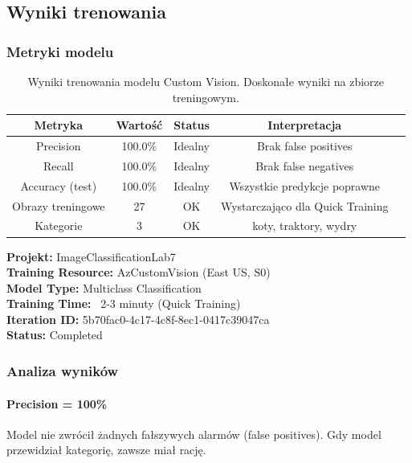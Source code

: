 \subsection{Wyniki trenowania}

\subsubsection{Metryki modelu}

\begin{table}[H]
	\centering
	\begin{tabular}{|c|c|c|c|c|}
		\hline
		\textbf{Metryka} & \textbf{Wartość} & \textbf{Status} & \textbf{Interpretacja} \\
		\hline
		Precision & 100.0\% & Idealny & Brak false positives \\
		\hline
		Recall & 100.0\% & Idealny & Brak false negatives \\
		\hline
		Accuracy (test) & 100.0\% & Idealny & Wszystkie predykcje poprawne \\
		\hline
		Obrazy treningowe & 27 & OK & Wystarczająco dla Quick Training \\
		\hline
		Kategorie & 3 & OK & koty, traktory, wydry \\
		\hline
	\end{tabular}
	\caption{Wyniki trenowania modelu Custom Vision. Doskonałe wyniki na zbiorze treningowym.}
\end{table}

\textbf{Projekt:} ImageClassificationLab7 \\
\textbf{Training Resource:} AzCustomVision (East US, S0) \\
\textbf{Model Type:} Multiclass Classification \\
\textbf{Training Time:} ~2-3 minuty (Quick Training) \\
\textbf{Iteration ID:} 5b70fac0-4c17-4c8f-8ec1-0417c39047ca \\
\textbf{Status:} Completed

\subsubsection{Analiza wyników}

\paragraph{Precision = 100\%}
Model nie zwrócił żadnych fałszywych alarmów (false positives). Gdy model przewidział kategorię, zawsze miał rację.

